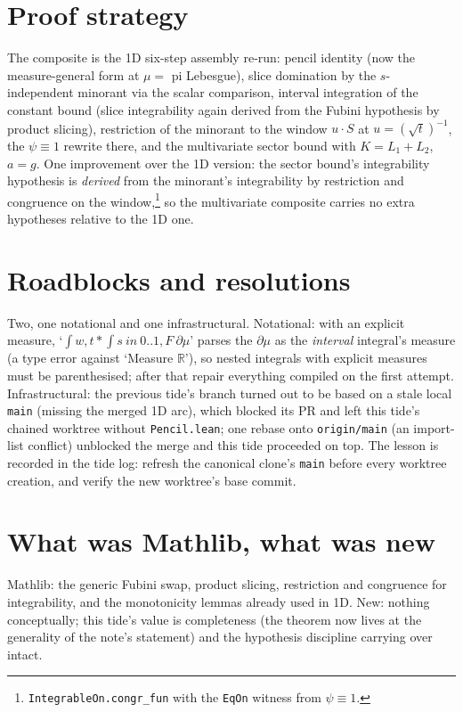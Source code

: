 \documentclass[11pt]{article}
\begin{document}
\section{Proof strategy}

The composite is the 1D six-step assembly re-run: pencil identity (now the
measure-general form at $\mu = $ pi Lebesgue), slice domination by the
$s$-independent minorant via the scalar comparison, interval integration of
the constant bound (slice integrability again derived from the Fubini
hypothesis by product slicing), restriction of the minorant to the window
$u \cdot S$ at $u = (\sqrt t)^{-1}$, the $\psi \equiv 1$ rewrite there, and
the multivariate sector bound with $K = L_1 + L_2$, $a = g$. One
improvement over the 1D version: the sector bound's integrability hypothesis
is \emph{derived} from the minorant's integrability by restriction and
congruence on the window,\footnote{\texttt{IntegrableOn.congr\_fun} with the
\texttt{EqOn} witness from $\psi \equiv 1$.} so the multivariate composite
carries no extra hypotheses relative to the 1D one.

\section{Roadblocks and resolutions}

Two, one notational and one infrastructural. Notational: with an explicit
measure, `$\int w, t * \int s\ in\ 0..1, F\ \partial\mu$' parses the
$\partial\mu$ as the \emph{interval} integral's measure (a type error
against `Measure $\mathbb{R}$'), so nested integrals with explicit measures
must be parenthesised; after that repair everything compiled on the first
attempt. Infrastructural: the previous tide's branch turned out to be based
on a stale local \texttt{main} (missing the merged 1D arc), which blocked
its PR and left this tide's chained worktree without \texttt{Pencil.lean};
one rebase onto \texttt{origin/main} (an import-list conflict) unblocked the
merge and this tide proceeded on top. The lesson is recorded in the tide
log: refresh the canonical clone's \texttt{main} before every
worktree creation, and verify the new worktree's base commit.

\section{What was Mathlib, what was new}

Mathlib: the generic Fubini swap, product slicing, restriction and
congruence for integrability, and the monotonicity lemmas already used in
1D. New: nothing conceptually; this tide's value is completeness (the
theorem now lives at the generality of the note's statement) and the
hypothesis discipline carrying over intact.
\end{document}
